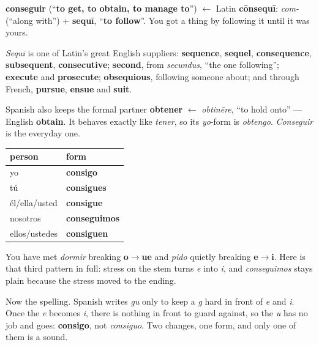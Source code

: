 \begin{cousinweb}
\textbf{conseguir} (\textquotedblleft{}\textbf{to get, to obtain, to manage to}\textquotedblright{}) $\leftarrow$ Latin \textbf{cōnsequī}: \emph{com-} (\textquotedblleft{}along with\textquotedblright{}) + \textbf{sequī}, \textquotedblleft{}\textbf{to follow}\textquotedblright{}. You got a thing by following it until it was yours.

\emph{Sequī} is one of Latin's great English suppliers: \textbf{sequence}, \textbf{sequel}, \textbf{consequence}, \textbf{subsequent}, \textbf{consecutive}; \textbf{second}, from \emph{secundus}, \textquotedblleft{}the one following\textquotedblright{}; \textbf{execute} and \textbf{prosecute}; \textbf{obsequious}, following someone about; and through French, \textbf{pursue}, \textbf{ensue} and \textbf{suit}.

Spanish also keeps the formal partner \textbf{obtener} $\leftarrow$ \emph{obtinēre}, \textquotedblleft{}to hold onto\textquotedblright{} — English \textbf{obtain}. It behaves exactly like \emph{tener}, so its \emph{yo}-form is \emph{obtengo}. \emph{Conseguir} is the everyday one.
\end{cousinweb}

\begin{grammarlens}[title={Grammar Lens: the third crack, and a silent u that leaves}]
\noindent
\begin{tabularx}{\linewidth}{@{}>{\raggedright\arraybackslash}X>{\raggedright\arraybackslash}X@{}}
\toprule
\textbf{person} & \textbf{form} \\
\midrule
yo & \textbf{consigo} \\
tú & \textbf{consigues} \\
él/ella/usted & \textbf{consigue} \\
nosotros & \textbf{conseguimos} \\
ellos/ustedes & \textbf{consiguen} \\
\bottomrule
\end{tabularx}

You have met \emph{dormir} breaking \textbf{o$\to$ue} and \emph{pido} quietly breaking \textbf{e$\to$i}. Here is that third pattern in full: stress on the stem turns \emph{e} into \emph{i}, and \emph{conseguimos} stays plain because the stress moved to the ending.

Now the spelling. Spanish writes \emph{gu} only to keep a \emph{g} hard in front of \emph{e} and \emph{i}. Once the \emph{e} becomes \emph{i}, there is nothing in front to guard against, so the \emph{u} has no job and goes: \textbf{consigo}, not \emph{consiguo}. Two changes, one form, and only one of them is a sound.
\end{grammarlens}

